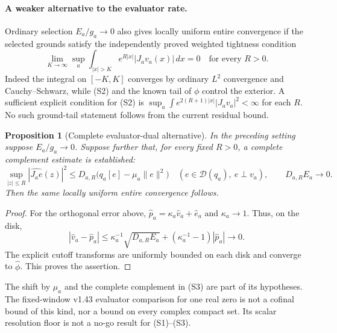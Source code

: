 \documentclass[11pt]{article}
\newtheorem{proposition}[theorem]{Proposition}
\theoremstyle{remark}
\begin{document}
\paragraph{A weaker alternative to the evaluator rate.}
Ordinary selection $E_a/g_a\to0$ also gives locally uniform entire
convergence if the selected grounds satisfy the independently proved
weighted tightness condition
\[
 \lim_{K\to\infty}\sup_a\int_{|x|>K}e^{R|x|}|J_av_a(x)|\,dx=0
 \quad\text{for every }R>0. \tag{S2}
\]
Indeed the integral on $[-K,K]$ converges by ordinary $L^2$ convergence
and Cauchy--Schwarz, while (S2) and the known tail of $\phi$ control
the exterior. A sufficient explicit condition for (S2) is
$\sup_a\int e^{2(R+1)|x|}|J_av_a|^2<\infty$ for each $R$.
No such ground-tail statement follows from the current residual bound.

\begin{proposition}[Complete evaluator-dual alternative]
\label{prop:ns43-ccm-evaluator-selection}
In the preceding setting suppose $E_a/g_a\to0$. Suppose further that,
for every fixed $R>0$, a complete complement estimate is established:
\[
 \sup_{|z|\le R}|\widehat{J_ae}(z)|^2
 \le D_{a,R}\bigl(q_a[e]-\mu_a\|e\|^2\bigr)
 \quad(e\in\mathcal D(q_a),\ e\perp v_a),
 \qquad D_{a,R}E_a\to0. \tag{S3}
\]
Then the same locally uniform entire convergence follows.
\end{proposition}
\begin{proof}
For the orthogonal error above,
$\widehat p_a=\kappa_a\widehat v_a+\widehat e_a$ and
$\kappa_a\to1$. Thus, on the disk,
\[
 |\widehat v_a-\widehat p_a|
 \le \kappa_a^{-1}\sqrt{D_{a,R}E_a}
       +(\kappa_a^{-1}-1)|\widehat p_a|\to0.
\]
The explicit cutoff transforms are uniformly bounded on each disk
and converge to $\widehat\phi$. This proves the assertion.
\end{proof}
The shift by $\mu_a$ and the complete complement in (S3) are part of
its hypotheses. The fixed-window v1.43 evaluator comparison for one
real zero is not a cofinal bound of this kind, nor a bound on every
complex compact set. Its scalar resolution floor is not a no-go
result for (S1)--(S3).
\end{document}
